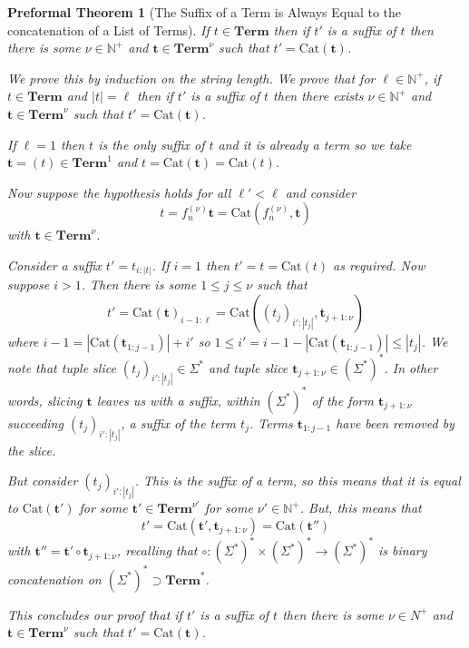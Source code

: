 \documentclass[oneside, 12pt]{book}
\theoremstyle{break}
\newtheorem{preformal definition}[definition]{Preformal Definition}
\newtheorem{preformal theorem}[theorem]{Preformal Theorem}
\newcommand{\bv}[1]{\boldsymbol{#1}}
\newcommand{\N}[0]{\mathbb{N}}
\newcommand{\norm}[1]{\left|#1\right|}
\begin{document}
		\begin{preformal theorem}[The Suffix of a Term is Always Equal to the concatenation of a List of Terms]			
			If $t \in \textbf{Term}$ then if $t'$ is a suffix of $t$ then there is some $\nu\in \N^+$ and $\bv{t} \in \textbf{Term}^\nu$ such that $t' = \text{Cat}(\bv{t})$.
			
			We prove this by induction on the string length.
			We prove that for $\ell \in \N^+$, if $t\in \textbf{Term}$ and $\norm{t} = \ell$ then if $t'$ is a suffix of $t$ then there exists $\nu\in \N^+$ and $\bv{t} \in \textbf{Term}^{\nu}$ such that $t' = \text{Cat}(\bv{t})$.
			
			If $\ell=1$ then $t$ is the only suffix of $t$ and it is already a term so we take $\bv{t} = (t) \in \textbf{Term}^1$ and $t = \text{Cat}(\bv{t}) = \text{Cat}(t)$.
			
			Now suppose the hypothesis holds for all $\ell' < \ell$ and consider
			\begin{equation*}
				t = f_n^{(\nu)} \bv{t} = \text{Cat}(f_n^{(\nu)}, \bv{t})
			\end{equation*}
			with $\bv{t} \in \textbf{Term}^{\nu}$.
			
			Consider a suffix $t' = t_{i:\norm{t}}$.
			If $i=1$ then $t' = t = \text{Cat}(t)$ as required.
			Now suppose $i > 1$.
			Then there is some $1 \le j \le \nu$ such that
			\begin{equation*}
				t' = \text{Cat}(\bv{t})_{i-1:\ell} = \text{Cat}((t_j)_{i':\norm{t_j}}, \bv{t}_{j+1:\nu})
			\end{equation*}
			where $i-1 = \norm{\text{Cat}(\bv{t}_{1:j-1})} + i'$ so $1 \le i' = i - 1 - \norm{\text{Cat}(\bv{t}_{1:j-1})} \le \norm{t_j}$.
			We note that tuple slice $(t_j)_{i':\norm{t_j}} \in \Sigma^*$ and tuple slice $\bv{t}_{j+1:\nu}\in (\Sigma^*)^*$.
			In other words, slicing $\bv{t}$ leaves us with a suffix, within $(\Sigma^*)^*$ of the form $\bv{t}_{j+1:\nu}$ succeeding $(t_j)_{i':\norm{t_j}}$, a suffix of the term $t_j$.
			Terms $\bv{t}_{1:j-1}$ have been removed by the slice.
			
			But consider $(t_j)_{i':\norm{t_j}}$. 
			This is the suffix of a term, so this means that it is equal to $\text{Cat}(\bv{t}')$ for some $\bv{t'} \in \textbf{Term}^{\nu'}$ for some $\nu' \in \N^+$.
			But, this means that
			\begin{equation*}
				t' = \text{Cat}(\bv{t}', \bv{t}_{j+1:\nu}) = \text{Cat}(\bv{t}'')
			\end{equation*}
			with $\bv{t}'' = \bv{t}' \circ \bv{t}_{j+1:\nu}$, recalling that $\circ: (\Sigma^*)^* \times (\Sigma^*)^* \to (\Sigma^*)^*$ is binary concatenation on $(\Sigma^*)^*\supset \textbf{Term}^*$.
			
			This concludes our proof that if $t'$ is a suffix of $t$ then there is some $\nu\in N^+$ and $\bv{t} \in \textbf{Term}^{\nu}$ such that $t' = \text{Cat}(\bv{t})$.
		\end{preformal theorem}
		
\end{document}
